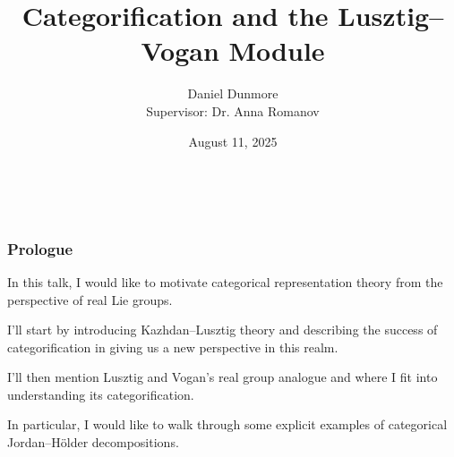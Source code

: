 \documentclass{beamer}
\title[{\fontsize{5.5}{4}\selectfont Categorification and the Lusztig--Vogan Module}]{Categorification and the Lusztig--Vogan Module}
\author[Daniel Dunmore]{
    Daniel Dunmore\\
    {\footnotesize Supervisor: Dr. Anna Romanov}
}
\institute[UNSW]{
	University of New South Wales \\
	\medskip
	\textit{d.dunmore@unsw.edu.au}
}
\date{August 11, 2025}
\begin{document}

\begin{frame}
\noindent\\[-20pt]
\begin{figure}[!ht]
\titlepage
\end{figure}
\end{frame}
\logo{}


\begin{frame}
\frametitle{Prologue}
\noindent In this talk, I would like to motivate categorical representation theory from the perspective of real Lie groups.\newline

\noindent I'll start by introducing Kazhdan--Lusztig theory and describing the success of categorification in giving us a new perspective in this realm.\newline

\noindent I'll then mention Lusztig and Vogan's real group analogue and where I fit into understanding its categorification.\newline

\noindent In particular, I would like to walk through some explicit examples of categorical Jordan--H\"{o}lder decompositions.
\end{frame}



\end{document}
